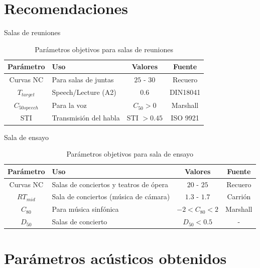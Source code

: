 \documentclass{sintefbeamer}
\begin{document}
\section{Recomendaciones}
\begin{frame}{Salas de reuniones}
    \begin{table}[H]
    \centering
    \begin{tabular}{|c|l|c|c|}
    \hline
    \textbf{Parámetro} & \textbf{Uso }                 & \textbf{Valores}     & \textbf{Fuente}  \\ \hline
    Curvas NC & Para salas de juntas & $25$ - $30$ & Recuero \\ \hline
    $T_{target}$ & Speech/Lecture (A2) & $0.6$ & DIN18041 \\ \hline
    $C_{50speech}$  & Para la voz &  $C_{50}>0$         &  Marshall  \\ \hline  
    STI & Transmisión del habla & STI $>0.45$ & ISO 9921\\ \hline
    \end{tabular}
    \caption{Parámetros objetivos para salas de reuniones}
    \label{tab: parametros objetivos sala de reuniones}
\end{table}
\end{frame}
\begin{frame}{Sala de ensayo}
    \begin{table}[H]
    \centering
    \begin{tabular}{|c|l|c|c|}
    \hline
    \textbf{Parámetro} & \textbf{Uso}                  & \textbf{Valores}     & \textbf{Fuente}  \\ \hline
    Curvas NC & Salas de conciertos y teatros de ópera & $20$ - $25$ & Recuero \\ \hline
    $RT_{mid}$ & Sala de conciertos (música de cámara) & $1.3$ - $1.7$ & Carrión \\ \hline
    $C_{80}$  & Para música sinfónica &  $-2<C_{80}<2$         &  Marshall  \\ \hline   
    $D_{50}$  & Salas de concierto         &  $D_{50}<0.5$         &  - \\ \hline
    \end{tabular}
    \caption{Parámetros objetivos para sala de ensayo}
    \label{tab: parametros objetivos sala de ensayo}
\end{table}
\end{frame}

\section{Parámetros acústicos obtenidos}
\end{document}
